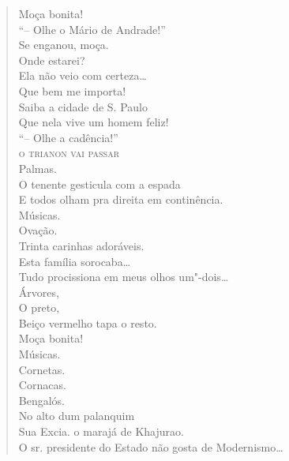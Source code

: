 {\begin{verse}
Moça bonita!\\
``-- Olhe o Mário de Andrade!''\\
Se enganou, moça.\\
\qquad\qquad\qquad Onde estarei?\\
\qquad\qquad\qquad Ela não veio com certeza\ldots{}\\
\qquad\qquad\qquad Que bem me importa!\\
\qquad\qquad\qquad Saiba a cidade de S. Paulo\\
\qquad\qquad\qquad Que nela vive um homem feliz!\\
``-- Olhe a cadência!''\\
\qquad\qquad\textsc{o trianon vai passar}\\
Palmas.\\
O tenente gesticula com a espada\\
E todos olham pra direita em continência.\\
Músicas.\\
Ovação.\\
Trinta carinhas adoráveis.\\
Esta família sorocaba\ldots{}\\
Tudo procissiona em meus olhos um"-dois\ldots{}\\
\qquad\qquad\qquad\qquad\qquad\quad Árvores,\\
\qquad\qquad\qquad\qquad\qquad\quad O preto,\\
\qquad\qquad\qquad\qquad\qquad\quad Beiço vermelho tapa o resto.\\
\qquad\qquad\qquad\qquad\qquad\quad Moça bonita!\\
\qquad\qquad\qquad\qquad\qquad\quad Músicas.\\
\qquad\qquad\qquad\qquad\qquad\quad Cornetas.\\
\qquad\qquad\qquad\qquad\quad Cornacas.\\
\qquad\qquad\qquad\quad Bengalós.\\
\qquad No alto dum palanquim\\
\qquad Sua Excia. o marajá de Khajurao.\\
O sr. presidente do Estado não gosta de Modernismo\ldots{}


\end{verse}}

